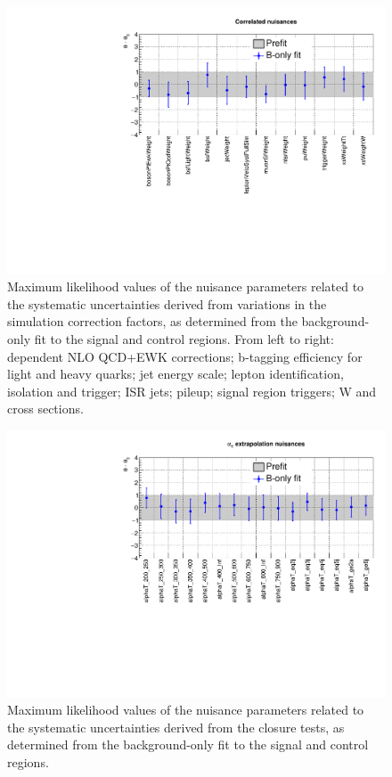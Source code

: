 \begin{figure}[h!]
	\centering
	\includegraphics[width=1.\linewidth]{figs/results/nuis/Correlated_nuisances}
	\caption{Maximum likelihood values of the nuisance parameters related to 
	the systematic uncertainties derived from variations in the simulation 
	correction factors, as determined from the background-only fit to the 
	signal and control regions. From left to right: \pt dependent NLO QCD+EWK 
	corrections; b-tagging efficiency for light and heavy quarks; jet energy 
	scale; lepton identification, isolation and trigger; ISR jets; pileup; 
	signal region triggers; W and \ttbar cross sections.}
\end{figure}

\begin{figure}[h!]
	\centering
	\includegraphics[width=0.8\linewidth]{figs/results/nuis/AlphaT_nuisances}
	\caption{Maximum likelihood values of the nuisance parameters related to 
	the systematic uncertainties derived from the \alphat closure tests, as 
	determined from the background-only fit to the signal and control regions.}
\end{figure}

